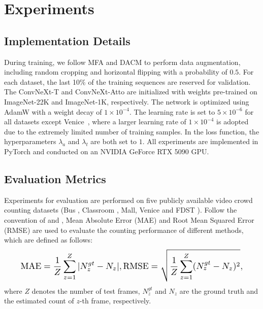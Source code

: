 \documentclass[lettersize,journal]{IEEEtran}
\begin{document}
\section{Experiments}
\subsection{Implementation Details}\label{ID}
During training, we follow MFA \cite{ling2023motional} and DACM \cite{ling2025dual} to perform data augmentation, including random cropping and horizontal flipping with a probability of $0.5$. For each dataset, the last 10\% of the training sequences are reserved for validation. The ConvNeXt-T\cite{liu2022convnet} and ConvNeXt-Atto\cite{woo2023convnext} are initialized with weights pre-trained on ImageNet-22K and ImageNet-1K, respectively. The network is optimized using AdamW with a weight decay of $1\times10^{-4}$. The learning rate is set to $5\times10^{-6}$ for all datasets except Venice~\cite{liu2019context}, where a larger learning rate of $1\times10^{-4}$ is adopted due to the extremely limited number of training samples. In the loss function, the hyperparameters $\lambda_a$ and $\lambda_t$ are both set to $1$. All experiments are implemented in PyTorch and conducted on an NVIDIA GeForce RTX 5090 GPU.



\vspace{-1em}
\subsection{Evaluation Metrics}
Experiments for evaluation are performed on five publicly available video crowd counting datasets (Bus \cite{ling2023motional}, Classroom \cite{ling2023motional}, Mall\cite{chen2012feature}, Venice \cite{liu2019context} and FDST \cite{fang2019locality}). Follow the convention of \cite{wu2022spatial,dong2022clrnet} and \cite{hou2023frame}, Mean Absolute Error (MAE) and Root Mean Squared Error (RMSE) are used to evaluate the counting performance of different methods, which are defined as follows:
\begin{equation}
\resizebox{.91\linewidth}{!}{$
            \displaystyle
\text{MAE}= \frac{1}{Z}\sum _{z=1}^{Z}|N_{z}^{gt}-N_{z}|,
\text{RMSE}= \sqrt{\frac{1}{Z}\sum _{z=1}^{Z}(N_{z}^{gt}-N_{z})^{2}},$}
\end{equation}
where $Z$ denotes the number of test frames, $N_{z}^{gt}$ and $N_{z}$ are the ground truth and the estimated count of $z$-th frame, respectively.
\end{document}
